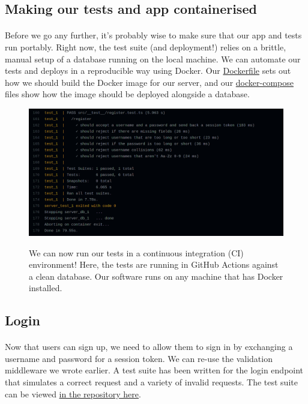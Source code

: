 \documentclass{report}
\begin{document}
\subsection{Making our tests and app containerised}
\paragraph{}
Before we go any further, it's probably wise to make sure that our app and tests run portably. Right now, the test suite (and deployment!) relies on a brittle, manual setup of a database running on the local machine. We can automate our tests and deploys in a reproducible way using Docker. Our \href{https://github.com/iroase-app/server/blob/main/Dockerfile}{Dockerfile} sets out how we should build the Docker image for our server, and our \href{https://github.com/iroase-app/server/blob/main/docker-compose.test.yml}{docker-compose} files show how the image should be deployed alongside a database.

\begin{figure}[H]
  \includegraphics[width=\linewidth]{./media/development/backend/tests/docker/pass.png}
  \label{fig:tests2}
  \caption{We can now run our tests in a continuous integration (CI) environment! Here, the tests are running in GitHub Actions against a clean database. Our software runs on any machine that has Docker installed.}
\end{figure}

\subsection{Login}
\paragraph{}
Now that users can sign up, we need to allow them to sign in by exchanging a username and password for a session token. We can re-use the validation middleware we wrote earlier. A test suite has been written for the login endpoint that simulates a correct request and a variety of invalid requests. The test suite can be viewed \href{https://github.com/iroase-app/server/tree/main/src/__test__/login.test.ts}{in the repository here}.
\end{document}
